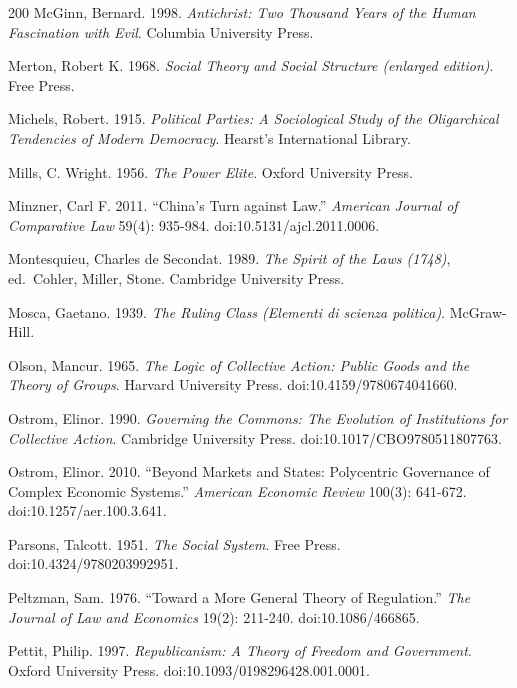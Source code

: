 \documentclass[11pt,letterpaper]{article}
\theoremstyle{definition}
\theoremstyle{remark}
\begin{document}
\begin{thebibliography}{200}
McGinn, Bernard. 1998. \emph{Antichrist: Two Thousand Years of the Human Fascination with Evil}. Columbia University Press.

Merton, Robert K. 1968. \emph{Social Theory and Social Structure (enlarged edition)}. Free Press.

Michels, Robert. 1915. \emph{Political Parties: A Sociological Study of the Oligarchical Tendencies of Modern Democracy}. Hearst's International Library.

Mills, C. Wright. 1956. \emph{The Power Elite}. Oxford University Press.

Minzner, Carl F. 2011. ``China's Turn against Law.'' \emph{American Journal of Comparative Law} 59(4): 935-984. doi:10.5131/ajcl.2011.0006.

Montesquieu, Charles de Secondat. 1989. \emph{The Spirit of the Laws (1748)}, ed.~Cohler, Miller, Stone. Cambridge University Press.

Mosca, Gaetano. 1939. \emph{The Ruling Class (Elementi di scienza politica)}. McGraw-Hill.

Olson, Mancur. 1965. \emph{The Logic of Collective Action: Public Goods and the Theory of Groups}. Harvard University Press. doi:10.4159/9780674041660.

Ostrom, Elinor. 1990. \emph{Governing the Commons: The Evolution of Institutions for Collective Action}. Cambridge University Press. doi:10.1017/CBO9780511807763.

Ostrom, Elinor. 2010. ``Beyond Markets and States: Polycentric Governance of Complex Economic Systems.'' \emph{American Economic Review} 100(3): 641-672. doi:10.1257/aer.100.3.641.

Parsons, Talcott. 1951. \emph{The Social System}. Free Press. doi:10.4324/9780203992951.

Peltzman, Sam. 1976. ``Toward a More General Theory of Regulation.'' \emph{The Journal of Law and Economics} 19(2): 211-240. doi:10.1086/466865.

Pettit, Philip. 1997. \emph{Republicanism: A Theory of Freedom and Government}. Oxford University Press. doi:10.1093/0198296428.001.0001.


\end{thebibliography}
\end{document}
